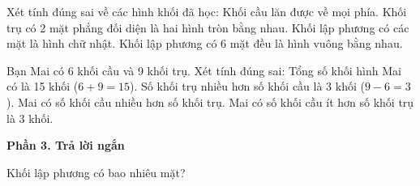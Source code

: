\begin{ex} %
Xét tính đúng sai về các hình khối đã học:
\choiceTF
{\True Khối cầu lăn được về mọi phía.}
{\True Khối trụ có 2 mặt phẳng đối diện là hai hình tròn bằng nhau.}
{Khối lập phương có các mặt là hình chữ nhật.}
{\True Khối lập phương có 6 mặt đều là hình vuông bằng nhau.}
\end{ex}

\begin{ex} %
Bạn Mai có 6 khối cầu và 9 khối trụ. Xét tính đúng sai:
\choiceTF
{\True Tổng số khối hình Mai có là 15 khối ($6 + 9 = 15$).}
{\True Số khối trụ nhiều hơn số khối cầu là 3 khối ($9 - 6 = 3$).}
{Mai có số khối cầu nhiều hơn số khối trụ.}
{\True Mai có số khối cầu ít hơn số khối trụ là 3 khối.}
\end{ex}

\textbf{Phần 3. Trả lời ngắn}

\begin{ex} %
Khối lập phương có bao nhiêu mặt?
\end{ex}

